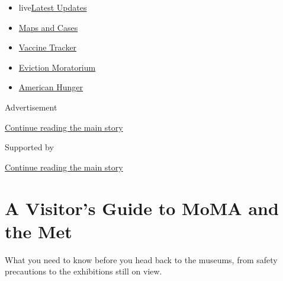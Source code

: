 \begin{itemize}
\tightlist
\item
  live\href{https://www.nytimes3xbfgragh.onion/2020/09/08/world/covid-19-coronavirus.html?name=styln-coronavirus-national\&region=TOP_BANNER\&block=storyline_menu_recirc\&action=click\&pgtype=Article\&impression_id=0c415230-f27e-11ea-b9bc-3185cbd6b8a2\&variant=undefined}{Latest
  Updates}
\item
  \href{https://www.nytimes3xbfgragh.onion/interactive/2020/us/coronavirus-us-cases.html?name=styln-coronavirus-national\&region=TOP_BANNER\&block=storyline_menu_recirc\&action=click\&pgtype=Article\&impression_id=0c415231-f27e-11ea-b9bc-3185cbd6b8a2\&variant=undefined}{Maps
  and Cases}
\item
  \href{https://www.nytimes3xbfgragh.onion/interactive/2020/science/coronavirus-vaccine-tracker.html?name=styln-coronavirus-national\&region=TOP_BANNER\&block=storyline_menu_recirc\&action=click\&pgtype=Article\&impression_id=0c415232-f27e-11ea-b9bc-3185cbd6b8a2\&variant=undefined}{Vaccine
  Tracker}
\item
  \href{https://www.nytimes3xbfgragh.onion/2020/09/02/your-money/eviction-moratorium-covid.html?name=styln-coronavirus-national\&region=TOP_BANNER\&block=storyline_menu_recirc\&action=click\&pgtype=Article\&impression_id=0c415233-f27e-11ea-b9bc-3185cbd6b8a2\&variant=undefined}{Eviction
  Moratorium}
\item
  \href{https://www.nytimes3xbfgragh.onion/interactive/2020/09/02/magazine/food-insecurity-hunger-us.html?name=styln-coronavirus-national\&region=TOP_BANNER\&block=storyline_menu_recirc\&action=click\&pgtype=Article\&impression_id=0c415234-f27e-11ea-b9bc-3185cbd6b8a2\&variant=undefined}{American
  Hunger}
\end{itemize}

Advertisement

\protect\hyperlink{after-top}{Continue reading the main story}

Supported by

\protect\hyperlink{after-sponsor}{Continue reading the main story}

\hypertarget{a-visitors-guide-to-moma-and-the-met}{%
\section{A Visitor's Guide to MoMA and the
Met}\label{a-visitors-guide-to-moma-and-the-met}}

What you need to know before you head back to the museums, from safety
precautions to the exhibitions still on view.

